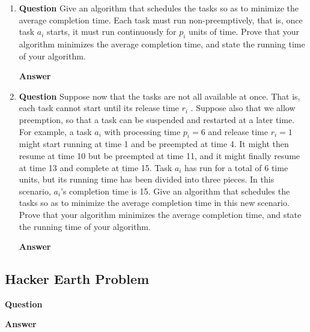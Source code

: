 \documentclass[]{book}
\theoremstyle{definition}
\begin{document}
    \begin{enumerate}[label={\alph*.}]
    \item 
        \textbf{Question} Give an algorithm that schedules the tasks so as to minimize the average
        completion time. Each task must run non-preemptively, that is, once task $a_i$ starts, it
        must run continuously for $p_i$ units of time. Prove that your algorithm minimizes
        the average completion time, and state the running time of your algorithm.

        \textbf{Answer}

    \item 

        \textbf{Question} Suppose now that the tasks are not all available at once. That is, each task
        cannot start until its release time $r_i$ . Suppose also that we allow preemption, so
        that a task can be suspended and restarted at a later time. For example, a task $a_i$
        with processing time $p_i = 6$ and release time $r_i = 1$ might start running at
        time 1 and be preempted at time 4. It might then resume at time 10 but be
        preempted at time 11, and it might finally resume at time 13 and complete at
        time 15. Task $a_i$ has run for a total of 6 time units, but its running time has been
        divided into three pieces. In this scenario, $a_i$'s completion time is 15. Give
        an algorithm that schedules the tasks so as to minimize the average completion
        time in this new scenario. Prove that your algorithm minimizes the average
        completion time, and state the running time of your algorithm.

        \textbf{Answer}

    \end{enumerate}

\subsection*{Hacker Earth Problem}

\textbf{Question} 


\textbf{Answer}
\end{document}
